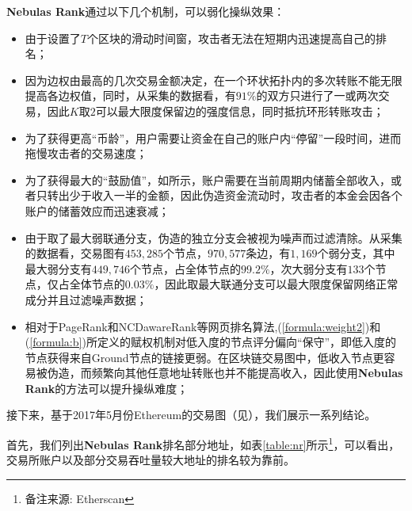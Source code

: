 \textbf{Nebulas Rank}通过以下几个机制，可以弱化操纵效果：
\begin{itemize}
	\item 由于设置了$T$个区块的滑动时间窗，攻击者无法在短期内迅速提高自己的排名；
	\item 因为边权由最高的几次交易金额决定，在一个环状拓扑内的多次转账不能无限提高各边权值，同时，从采集的数据看，有$91\%$的双方只进行了一或两次交易，因此$K$取$2$可以最大限度保留边的强度信息，同时抵抗环形转账攻击；
	\item 为了获得更高“币龄”，用户需要让资金在自己的账户内“停留”一段时间，进而拖慢攻击者的交易速度；
	\item 为了获得最大的“鼓励值”，如所示，账户需要在当前周期内储蓄全部收入，或者只转出少于收入一半的金额，因此伪造资金流动时，攻击者的本金会因各个账户的储蓄效应而迅速衰减；
	\item 由于取了最大弱联通分支，伪造的独立分支会被视为噪声而过滤清除。从采集的数据看，交易图有$453,285$个节点，$970,577$条边，有$1,169$个弱分支，其中最大弱分支有$449,746$个节点，占全体节点的$99.2\%$，次大弱分支有$133$个节点，仅占全体节点的$0.03\%$，因此取最大联通分支可以最大限度保留网络正常成分并且过滤噪声数据；
	\item 相对于PageRank和NCDawareRank\cite{Nikolakopoulos2013}等网页排名算法,(\ref{formula:weight2})和(\ref{formula:b})所定义的赋权机制对低入度的节点评分偏向“保守”，即低入度的节点获得来自Ground节点的链接更弱。在区块链交易图中，低收入节点更容易被伪造，而频繁向其他任意地址转账也并不能提高收入，因此使用\textbf{Nebulas Rank}的方法可以提升操纵难度；
\end{itemize}

接下来，基于2017年5月份Ethereum的交易图（见），我们展示一系列结论。

首先，我们列出\textbf{Nebulas Rank}排名部分地址，如表\ref{table:nr}所示\footnote{备注来源: Etherscan\cite{etherscan}}，可以看出，交易所账户以及部分交易吞吐量较大地址的排名较为靠前。

\newpage


